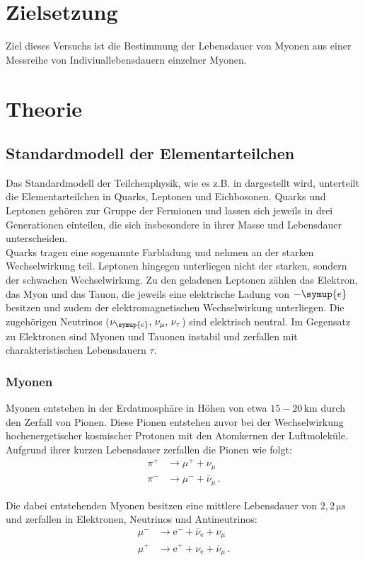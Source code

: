 \section{Zielsetzung}
\label{sec:Zielsetzung}
Ziel dieses Versuchs ist die Bestimmung der Lebensdauer von Myonen aus einer Messreihe von Indiviuallebensdauern einzelner Myonen.
\section{Theorie}
\label{sec:Theorie}
\subsection{Standardmodell der Elementarteilchen}
Das Standardmodell der Teilchenphysik, wie es z.B. in \cite{Astroteilchenphysik} dargestellt wird, unterteilt die Elementarteilchen in Quarks, Leptonen und Eichbosonen.
Quarks und Leptonen gehören zur Gruppe der Fermionen und lassen sich jeweils in drei Generationen einteilen, 
die sich insbesondere in ihrer Masse und Lebensdauer unterscheiden.\\
Quarks tragen eine sogenannte Farbladung und nehmen an der starken Wechselwirkung teil. 
Leptonen hingegen unterliegen nicht der starken, sondern der schwachen Wechselwirkung. 
Zu den geladenen Leptonen zählen das Elektron, das Myon und das Tauon, die jeweils eine elektrische Ladung von $-\symup{e}$ besitzen und zudem der elektromagnetischen Wechselwirkung 
unterliegen. 
Die zugehörigen Neutrinos ($\nu_{\symup{e}},\, \nu_\mu,\, \nu_\tau$) sind elektrisch neutral. Im Gegensatz zu Elektronen sind Myonen und Tauonen instabil und zerfallen mit charakteristischen Lebensdauern $\tau$.

\subsubsection{Myonen}
\label{sec:Myonen}
Myonen entstehen in der Erdatmosphäre in Höhen von etwa $15{-}20\,\unit{\kilo\meter}$ durch den Zerfall von Pionen. 
Diese Pionen entstehen zuvor bei der Wechselwirkung hochenergetischer kosmischer Protonen mit den Atomkernen der Luftmoleküle. 
Aufgrund ihrer kurzen Lebensdauer zerfallen die Pionen wie folgt:
\begin{align*}
	\pi^+ &\rightarrow \mu^+ + \nu_\mu \\
	\pi^- &\rightarrow \mu^- + \bar{\nu}_\mu\,.
\end{align*}

Die dabei entstehenden Myonen besitzen eine mittlere Lebensdauer von $2,2\,\unit{\micro\second}$ und zerfallen in Elektronen, Neutrinos und Antineutrinos:
\begin{align*}
	\mu^- &\rightarrow \text{e}^- + \bar{\nu}_\text{e} + \nu_\mu \\
	\mu^+ &\rightarrow \text{e}^+ + \nu_\text{e} + \bar{\nu}_\mu\,.
\end{align*}

